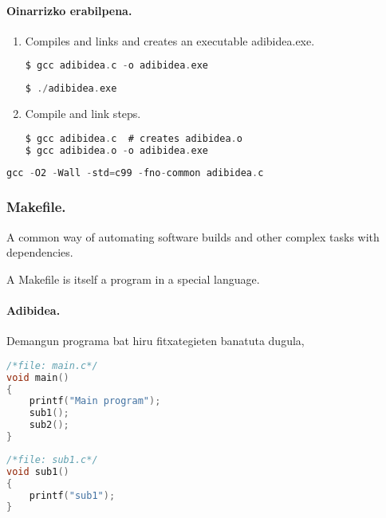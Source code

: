\paragraph*{Oinarrizko erabilpena.}

\begin{enumerate}
\item Compiles and links and creates an executable adibidea.exe.
\begin{lstlisting}[language=C]
$ gcc adibidea.c -o adibidea.exe
\end{lstlisting}

\begin{lstlisting}[language=C]
$ ./adibidea.exe
\end{lstlisting}

\item Compile and link steps.

\begin{lstlisting}[language=C]
$ gcc adibidea.c  # creates adibidea.o
$ gcc adibidea.o -o adibidea.exe
\end{lstlisting}

\end{enumerate}

\begin{lstlisting}[language=C]
gcc -O2 -Wall -std=c99 -fno-common adibidea.c
\end{lstlisting}

\subsubsection*{Makefile.}

A common way of automating software builds and other complex tasks with dependencies.

A Makefile is itself a program in a special language.

\paragraph*{Adibidea.}
Demangun programa bat hiru fitxategieten banatuta dugula,

\begin{lstlisting}[language=C]
/*file: main.c*/
void main()
{
    printf("Main program");
    sub1();
    sub2();
}
\end{lstlisting}

\begin{lstlisting}[language=C]
/*file: sub1.c*/
void sub1()
{
    printf("sub1");
}
\end{lstlisting}

